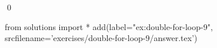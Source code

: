 
    \begin{ex}
  \label{ex:double-for-loop-9}
  
  \qed
\end{ex}
\begin{python0}
from solutions import *
add(label="ex:double-for-loop-9",
    srcfilename='exercises/double-for-loop-9/answer.tex') 
\end{python0}                              
